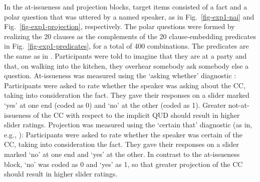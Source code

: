 \documentclass[11pt,fleqn]{article}
\newcommand{\6}{\mbox{$[\hspace*{-.6mm}[$}}
\newcommand{\9}{\mbox{$]\hspace*{-.6mm}]$}}
\begin{document}
In the at-issueness and projection blocks, target items consisted of a fact and a polar question that was uttered by a named speaker, as in Fig.~\ref{fig-exp1-nai} and Fig.~\ref{fig-exp1-projection}, respectively. The polar questions were formed by realizing the 20 clauses as the complements of the 20 clause-embedding predicates in Fig.~\ref{fig-exp1-predicates}, for a total of 400 combinations. The predicates are the same as in \citealt{degen-tonhauser-openmind,degen-tonhauser-language}.  Participants were told to imagine that they are at a party and that, on walking into the kitchen, they overhear somebody ask somebody else a question. At-issueness was measured using the `asking whether' diagnostic  \citep[as in][]{tbd-variability}: Participants were asked to rate whether the speaker was asking about the CC, taking into consideration the fact. They gave their responses on a slider marked `yes' at one end (coded as 0) and `no' at the other (coded as 1). Greater not-at-issueness of the CC with respect to the implicit QUD should result in higher slider ratings. Projection was measured using the `certain that' diagnostic (as in, e.g., \citealt{tbd-variability, mahler2020,degen-tonhauser-language}): Participants were asked to rate whether the speaker was certain of the CC, taking into consideration the fact. They gave their responses on a slider marked `no' at one end and `yes' at the other.  In contrast to the at-issueness block, `no' was coded as 0 and `yes' as 1, so that greater projection of the CC should result in higher slider ratings. 
\end{document}
